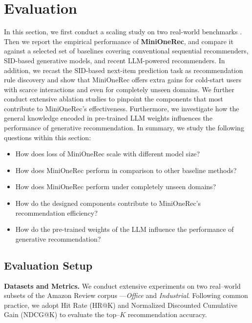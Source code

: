 \section{Evaluation}
\label{results}
In this section, we first conduct a scaling study on two real-world benchmarks \citep{amazon}.
Then we report the empirical performance of \textbf{MiniOneRec}, and compare it against a selected set of baselines covering conventional sequential recommenders, SID-based generative models, and recent LLM-powered recommenders.
In addition, we recast the SID-based next-item prediction task as
recommendation rule discovery and show that MiniOneRec offers extra gains for cold-start users with scarce interactions and even for completely unseen domains.
We further conduct extensive ablation studies to pinpoint the components that most contribute to MiniOneRec’s effectiveness. 
Furthermore, we investigate how the general knowledge encoded in pre-trained LLM weights influences the performance of generative recommendation.
In summary, we study the following questions within this section:
\begin{itemize}[leftmargin=*]
    \item How does loss of MiniOneRec scale with different model size?
    
    \item How does MiniOneRec perform in comparison to other baseline methods?
    
    \item How does MiniOneRec perform under completely unseen domains?
    
    \item How do the designed components contribute to MiniOneRec's recommendation efficiency?

    \item How do the pre-trained weights of the LLM influence the performance of generative recommendation?

\end{itemize}

\subsection{Evaluation Setup}

\textbf{Datasets and Metrics.} 
We conduct extensive experiments on two real–world subsets of the Amazon Review corpus \citep{amazon} —\textit{Office} and \textit{Industrial}.  
Following common practice, we adopt Hit Rate (HR@K) and Normalized Discounted Cumulative Gain (NDCG@K) to evaluate the top–$K$ recommendation accuracy. 


